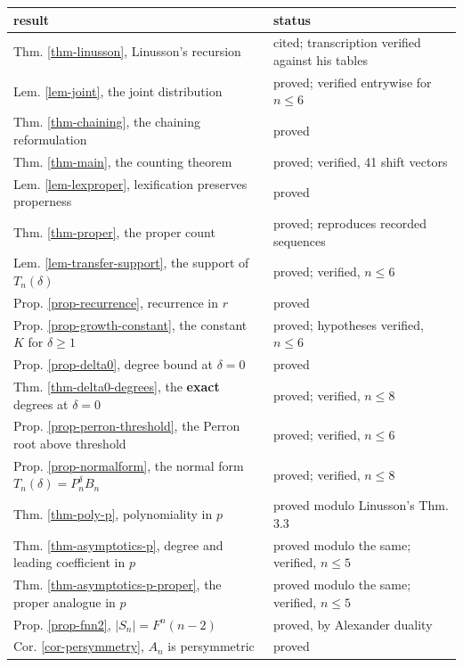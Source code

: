 \documentclass[11pt, a4paper, abstract=yes]{scrartcl}
\theoremstyle{definition}
\theoremstyle{remark}
\theoremstyle{plain}
\begin{document}
\begin{center}
\small
\begin{tabular}{ll}
result & status\\
\hline
Thm. \ref{thm-linusson}, Linusson's recursion & cited; transcription verified against his tables\\
Lem. \ref{lem-joint}, the joint distribution & proved; verified entrywise for \(n\le6\)\\
Thm. \ref{thm-chaining}, the chaining reformulation & proved\\
Thm. \ref{thm-main}, the counting theorem & proved; verified, 41 shift vectors\\
Lem. \ref{lem-lexproper}, lexification preserves properness & proved\\
Thm. \ref{thm-proper}, the proper count & proved; reproduces recorded sequences\\
Lem. \ref{lem-transfer-support}, the support of \(T_n(\delta)\) & proved; verified, \(n\le6\)\\
Prop. \ref{prop-recurrence}, recurrence in \(r\) & proved\\
Prop. \ref{prop-growth-constant}, the constant \(K\) for \(\delta\ge1\) & proved; hypotheses verified, \(n\le6\)\\
Prop. \ref{prop-delta0}, degree bound at \(\delta=0\) & proved\\
Thm. \ref{thm-delta0-degrees}, the \textbf{exact} degrees at \(\delta=0\) & proved; verified, \(n\le8\)\\
Prop. \ref{prop-perron-threshold}, the Perron root above threshold & proved; verified, \(n\le6\)\\
Prop. \ref{prop-normalform}, the normal form \(T_n(\delta)=P_n^{\delta}B_n\) & proved; verified, \(n\le8\)\\
Thm. \ref{thm-poly-p}, polynomiality in \(p\) & proved modulo Linusson's Thm. 3.3\\
Thm. \ref{thm-asymptotics-p}, degree and leading coefficient in \(p\) & proved modulo the same; verified, \(n\le5\)\\
Thm. \ref{thm-asymptotics-p-proper}, the proper analogue in \(p\) & proved modulo the same; verified, \(n\le5\)\\
Prop. \ref{prop-fnn2}, \(\lvert S_n\rvert=F^n(n-2)\) & proved, by Alexander duality\\
Cor. \ref{cor-persymmetry}, \(A_n\) is persymmetric & proved\\
\end{tabular}

\end{center}
\end{document}
